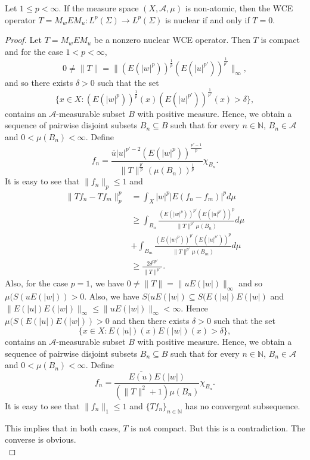 \documentclass[10pt,a4paper]{amsart}
\newcommand{\A}{\mathcal{A}}
\begin{document}
\begin{cor}\label{c2.2} Let $1\leq p<\infty$. If the
measure space $(X,\mathcal{A},\mu)$ is non-atomic, then the WCE operator $T=M_wEM_u:L^{p}(\Sigma)\rightarrow L^{p}(\Sigma)$ is
nuclear if and only if  $T=0$.
\end{cor}

\begin{proof} Let $T=M_wEM_u$ be a nonzero
nuclear WCE operator. Then $T$ is compact and for the case $1<p<\infty$,
$$0\neq\|T\|=\|(E(|w|^{p}))^{\frac{1}{p}}(E(|u|^{p'}))^{\frac{1}{p'}}\|_{\infty},$$
and so there exists $\delta>0$ such that the set
$$\{x\in
X:(E(|w|^{p}))^{\frac{1}{p}}(x)(E(|u|^{p'}))^{\frac{1}{p'}}(x)>\delta\},$$
contains an $\mathcal{A}$-measurable subset $B$ with positive
measure. Hence, we obtain a sequence of pairwise disjoint subsets
$B_{n}\subseteq B$ such that for every $n\in\mathbb{N}$,
$B_{n}\in\A$ and $0<\mu(B_{n})<\infty$. Define
$$f_{n}=\frac{\overline{u}|u|^{p'-2}(E(|w|^{p}))^{\frac{p'-1}{p}}}
{\|T\|^{\frac{p'}{p}} (\mu(B_{n}))^{\frac{1}{p}}}\chi_{B_{n}}.$$
It is easy to see that $\|f_{n}\|_{p}\leq1$ and
\begin{align*}
\|Tf_{n}-Tf_{m}\|^{p}_{p}&=\int_{X}|w|^{p}|E(f_{n}-f_{m})|^{p}d\mu\\
&\geq\int_{B_{n}}\frac{(E(|w|^{p}))^{p'}(E(|u|^{p'}))^{p}}{\|T\|^{p'}\mu(B_{n})}d\mu\\
&+ \int_{B_{m}}\frac{(E(|w|^{p}))^{p'}(E(|u|^{p'}))^{p}}{\|T\|^{p'}\mu(B_{m})}d\mu\\
 &\geq \frac{2\delta^{pp'}} {\|T\|^{p'}}.
 \end{align*}
 Also, for the case $p=1$, we have
 $0\neq\|T\|=\|uE(|w|)\|_{\infty}$ and so $\mu(S(uE(|w|))>0$. Also, we have $S(uE(|w|)\subseteq S(E(|u|)E(|w|)$ and $\|E(|u|)E(|w|)\|_{\infty}\leq \|uE(|w|)\|_{\infty}<\infty$. Hence $\mu(S(E(|u|)E(|w|))>0$ and then there exists $\delta>0$ such that the set
$$\{x\in
X:E(|u|)(x)E(|w|)(x)>\delta\},$$
contains an $\mathcal{A}$-measurable subset $B$ with positive
measure. Hence, we obtain a sequence of pairwise disjoint subsets
$B_{n}\subseteq B$ such that for every $n\in\mathbb{N}$,
$B_{n}\in\A$ and $0<\mu(B_{n})<\infty$. Define
$$f_{n}=\frac{\overline{E(u)}E(|w|)}
{(\|T\|^2+1)\mu(B_{n})}\chi_{B_{n}}.$$
It is easy to see that $\|f_{n}\|_{1}\leq1$ and $\{Tf_n\}_{n\in \mathbb{N}}$ has no convergent subsequence.

  This implies that in both cases, $T$ is not compact. But this is a contradiction. The converse is obvious.\\
\end{proof}
\end{document}

